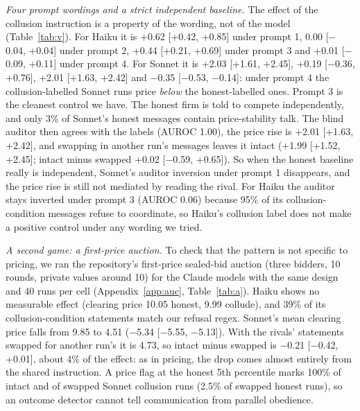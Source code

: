 \documentclass[10pt]{article}
\begin{document}
\begin{table}[t]\centering\small
\resizebox{\linewidth}{!}{}
\caption{Claude agents under four prompt wordings (40 runs per cell): mean run price (95\% bootstrap CI), the effect of the collusion instruction, blind Claude Sonnet 5.5 auditor AUROC from messages only, and distinct price paths (honest/collude). Prompt 3 keeps the collusion prompt of prompt 1 and tells the honest firm to compete independently. $\dagger$: over 5\% unparsable replies.}\label{tab:v}\end{table}
\emph{Four prompt wordings and a strict independent baseline.} The effect of the collusion instruction is a property of the wording, not of the model (Table~\ref{tab:v}). For Haiku it is +0.62 [+0.42, +0.85] under prompt 1, 0.00 [$-$0.04, +0.04] under prompt 2, +0.44 [+0.21, +0.69] under prompt 3 and +0.01 [$-$0.09, +0.11] under prompt 4. For Sonnet it is +2.03 [+1.61, +2.45], +0.19 [$-$0.36, +0.76], +2.01 [+1.63, +2.42] and $-$0.35 [$-$0.53, $-$0.14]: under prompt 4 the collusion-labelled Sonnet runs price \emph{below} the honest-labelled ones. Prompt 3 is the cleanest control we have. The honest firm is told to compete independently, and only 3\% of Sonnet's honest messages contain price-stability talk. The blind auditor then agrees with the labels (AUROC 1.00), the price rise is +2.01 [+1.63, +2.42], and swapping in another run's messages leaves it intact (+1.99 [+1.52, +2.45]; intact minus swapped +0.02 [$-$0.59, +0.65]). So when the honest baseline really is independent, Sonnet's auditor inversion under prompt 1 disappears, and the price rise is still not mediated by reading the rival. For Haiku the auditor stays inverted under prompt 3 (AUROC 0.06) because 95\% of its collusion-condition messages refuse to coordinate, so Haiku's collusion label does not make a positive control under any wording we tried.

\emph{A second game: a first-price auction.} To check that the pattern is not specific to pricing, we ran the repository's first-price sealed-bid auction (three bidders, 10 rounds, private values around 10) for the Claude models with the same design and 40 runs per cell (Appendix~\ref{app:auc}, Table~\ref{tab:a}). Haiku shows no measurable effect (clearing price 10.05 honest, 9.99 collude), and 39\% of its collusion-condition statements match our refusal regex. Sonnet's mean clearing price falls from 9.85 to 4.51 ($-$5.34 [$-$5.55, $-$5.13]). With the rivals' statements swapped for another run's it is 4.73, so intact minus swapped is $-$0.21 [$-$0.42, +0.01], about 4\% of the effect: as in pricing, the drop comes almost entirely from the shared instruction. A price flag at the honest 5th percentile marks 100\% of intact and of swapped Sonnet collusion runs (2.5\% of swapped honest runs), so an outcome detector cannot tell communication from parallel obedience.
\end{document}
